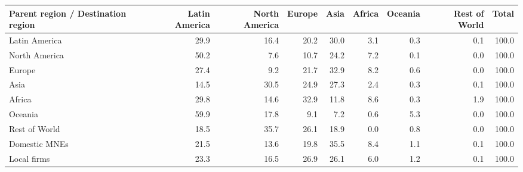 \begin{tabular}{lrrrrrrrr}
\toprule
Parent region / Destination region & Latin America & North America & Europe & Asia & Africa & Oceania & Rest of World & Total \\
\midrule
Latin America & 29.9 & 16.4 & 20.2 & 30.0 & 3.1 & 0.3 & 0.1 & 100.0 \\
North America & 50.2 & 7.6 & 10.7 & 24.2 & 7.2 & 0.1 & 0.0 & 100.0 \\
Europe & 27.4 & 9.2 & 21.7 & 32.9 & 8.2 & 0.6 & 0.0 & 100.0 \\
Asia & 14.5 & 30.5 & 24.9 & 27.3 & 2.4 & 0.3 & 0.1 & 100.0 \\
Africa & 29.8 & 14.6 & 32.9 & 11.8 & 8.6 & 0.3 & 1.9 & 100.0 \\
Oceania & 59.9 & 17.8 & 9.1 & 7.2 & 0.6 & 5.3 & 0.0 & 100.0 \\
Rest of World & 18.5 & 35.7 & 26.1 & 18.9 & 0.0 & 0.8 & 0.0 & 100.0 \\
Domestic MNEs & 21.5 & 13.6 & 19.8 & 35.5 & 8.4 & 1.1 & 0.1 & 100.0 \\
Local firms & 23.3 & 16.5 & 26.9 & 26.1 & 6.0 & 1.2 & 0.1 & 100.0 \\
\bottomrule
\end{tabular}
